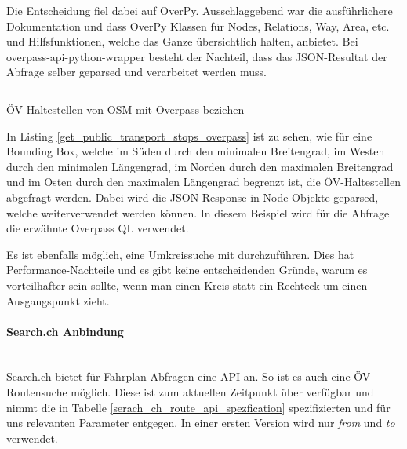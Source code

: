 Die Entscheidung fiel dabei auf OverPy. Ausschlaggebend war die ausführlichere Dokumentation und dass OverPy Klassen für Nodes, Relations, Way, Area, etc. und Hilfsfunktionen, welche das Ganze übersichtlich halten, anbietet. Bei overpass-api-python-wrapper besteht der Nachteil, dass das JSON-Resultat der Abfrage selber geparsed und verarbeitet werden muss.

\begin{listing}[ht]
    \inputminted{python}{projectdoc/listing/get_public_transport_stops_overpass.py}
    \caption{ÖV-Haltestellen von \acs{OSM} mit Overpass beziehen}
    \label{get_public_transport_stops_overpass}
\end{listing}

In Listing \ref{get_public_transport_stops_overpass} ist zu sehen, wie für eine Bounding Box, welche im Süden durch den minimalen Breitengrad, im Westen durch den minimalen Längengrad, im Norden durch den maximalen Breitengrad und im Osten durch den maximalen Längengrad begrenzt ist, die ÖV-Haltestellen abgefragt werden. Dabei wird die JSON-Response in Node-Objekte geparsed, welche weiterverwendet werden können. In diesem Beispiel wird für die Abfrage die erwähnte Overpass QL verwendet.

Es ist ebenfalls möglich, eine Umkreissuche mit  durchzuführen. Dies hat Performance-Nachteile und es gibt keine entscheidenden Gründe, warum es vorteilhafter sein sollte, wenn man einen Kreis statt ein Rechteck um einen Ausgangspunkt zieht.

\paragraph{Search.ch Anbindung}\label{architektur:Search.ch Anbindung}~\\
Search.ch bietet für Fahrplan-Abfragen eine API\cite{search_ch_route_api} an. So ist es auch eine ÖV-Routensuche möglich. Diese ist zum aktuellen Zeitpunkt über  verfügbar und nimmt die in Tabelle \ref{serach_ch_route_api_spezfication} spezifizierten und für uns relevanten Parameter entgegen. In einer ersten Version wird nur \emph{from} und \emph{to} verwendet.


